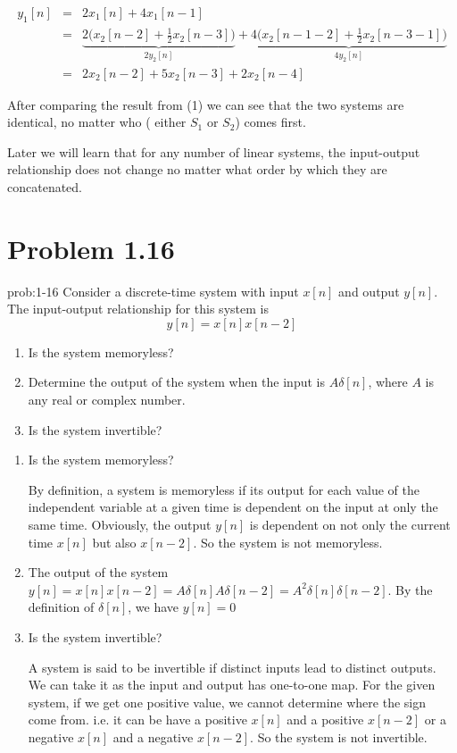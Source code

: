 \documentclass[koma,a4paper,utopia,12pt,listings-color,microtype,paralist,colorlinks,urlcolor=red]{org-article}
\begin{document}
\begin{eqnarray*}
y_{1}[n]&=& 2x_{1}[n] + 4x_{1}[n-1] \\
&=& \underbrace{2 \Big( x_{2}[n-2]  + \tfrac{1}{2} x_{2}[n-3] \Big)}_{2{y_{2}[n]}} + \underbrace{4 \Big( x_{2}[n-1-2] + \tfrac{1}{2}x_{2}[n-3-1] \Big)}_{4y_{2}[n]}   \\
&=& 2x_{2}[n-2] + 5x_{2}[n-3] + 2x_{2}[n-4]
\end{eqnarray*}

After comparing the result from (1) we can see that the two systems are
identical, no matter who ( either \(S_{1}\) or \(S_{2}\)) comes first.

Later we will learn that for any number of linear systems, the input-output
relationship does not change no matter what order by which they are
concatenated.
\section{Problem 1.16}
\label{sec:org3634202}


\begin{prob}[]{prob:1-16}
Consider a discrete-time system with input \(x[n]\) and output \(y[n]\).
The input-output relationship for this system is
\begin{equation*}
y[n] = x[n]x[n-2]
\end{equation*}

\begin{enumerate}
\item Is the system memoryless?
\item Determine the output of the system when the input is \(A\delta[n]\),
where \(A\) is any real or complex number.
\item Is the system invertible?
\end{enumerate}
\label{prob:1-16}
\end{prob}

\begin{enumerate}
\item Is the system memoryless?

By definition, a system is memoryless if its output for each value of
the independent variable at a given time is dependent on the input at
only the same time. Obviously, the output \(y[n]\) is dependent on not
only the current time \(x[n]\) but also \(x[n-2]\). So the system is not
memoryless.

\item The output of the system \(y[n] = x[n]x[n-2] = A \delta[n] A \delta[n-2]
        = A^{2} \delta[n]\delta[n-2]\). By the definition of \(\delta[n]\), we
have \(y[n] = 0\)

\item Is the system invertible?

A system is said to be invertible if distinct inputs lead to distinct
outputs. We can take it as the input and output has one-to-one map. For
the given system, if we get one positive value, we cannot determine
where the sign come from. i.e. it can be have a positive \(x[n]\) and a
positive \(x[n-2]\) or a negative \(x[n]\) and a negative \(x[n-2]\). So
the system is not invertible.
\end{enumerate}
\end{document}

